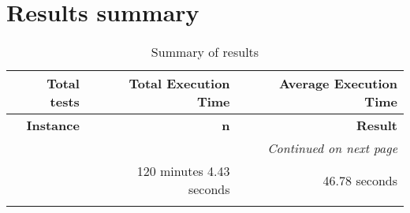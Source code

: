\section{Results summary}
\begin{longtable}{rrr}\toprule \textbf{Total tests}& \textbf{Total Execution Time}& \textbf{Average Execution Time}\\
\midrule
\endfirsthead
\toprule
\textbf{Instance} & \textbf{n} & \textbf{Result} \\
\midrule
\endhead
\midrule
\multicolumn{3}{r}{\textit{Continued on next page}} \\
\midrule
\endfoot
\bottomrule
\endlastfoot
154 & 120 minutes 4.43 seconds & 46.78 seconds \\
\caption{Summary of results}\label{table:results_summary}
\end{longtable}

